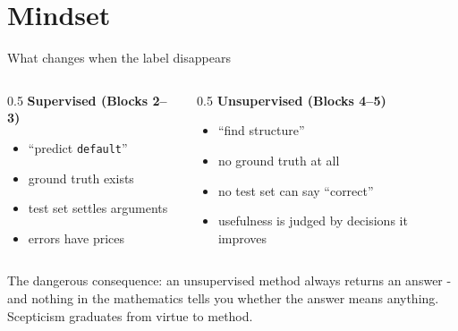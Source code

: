 \documentclass[10pt,aspectratio=169]{beamer}
\begin{document}
\section{Mindset}

\begin{frame}{What changes when the label disappears}
  \begin{columns}[T]
    \begin{column}{0.5\textwidth}
      \textbf{Supervised (Blocks 2--3)}
      \begin{itemize}\small
        \item ``predict \texttt{default}''
        \item ground truth exists
        \item test set settles arguments
        \item errors have prices
      \end{itemize}
    \end{column}
    \begin{column}{0.5\textwidth}
      \textbf{Unsupervised (Blocks 4--5)}
      \begin{itemize}\small
        \item ``find \alert{structure}''
        \item no ground truth at all
        \item no test set can say ``correct''
        \item usefulness is judged by \alert{decisions it improves}
      \end{itemize}
    \end{column}
  \end{columns}
  \vspace{0.8em}
  \begin{center}
    The dangerous consequence: an unsupervised method \alert{always returns
    an answer} - and nothing in the mathematics tells you whether the
    answer means anything. Scepticism graduates from virtue to method.
  \end{center}
\end{frame}
\end{document}
